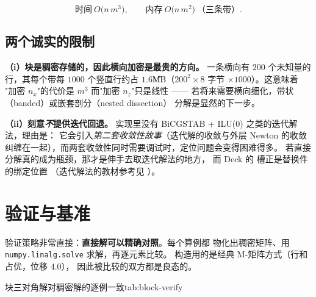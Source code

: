 \begin{equation}
\text{时间}\ O\bigl(n\,m^{3}\bigr),
\qquad
\text{内存}\ O\bigl(n\,m^{2}\bigr)\ \text{（三条带）}.
\label{eq:block-complexity}
\end{equation}

\subsection{两个诚实的限制}

\textbf{（i）块是稠密存储的，因此横向加密是最贵的方向。}
一条横向有 $200$ 个未知量的行，其每个带每 $1000$ 个竖直行约占
$1.6$\U{MB}（$200^2\times8$ 字节 $\times1000$）。这意味着
"加密 $n_x$"的代价是 $m^{3}$ 而"加密 $n_z$"只是线性 ——
若将来需要横向细化，带状（banded）或嵌套剖分（nested dissection）
分解是显然的下一步。

\textbf{（ii）刻意\emph{不}提供迭代回退。}
实现里没有 BiCGSTAB + ILU(0) 之类的迭代解法，理由是：
它会引入\emph{第二套收敛性故事}（迭代解的收敛与外层 Newton 的收敛
纠缠在一起），而两套收敛性同时需要调试时，定位问题会变得困难得多。
若直接分解真的成为瓶颈，那才是伸手去取迭代解法的地方，
而 Deck 的  槽正是替换件的绑定位置
（迭代解法的教材参考见 \cite{saad2003}）。

\section{验证与基准}
\label{sec:block-verification}

验证策略非常直接：\textbf{直接解可以精确对照}。每个算例都
物化出稠密矩阵、用 \texttt{numpy.linalg.solve} 求解，再逐元素比较。
构造用的是经典 M-矩阵方式（行和占优，位移 $4.0$），
因此被比较的双方都是良态的。

\begin{veriftable}{块三对角解对稠密解的逐例一致}{tab:block-verify}
\end{veriftable}

